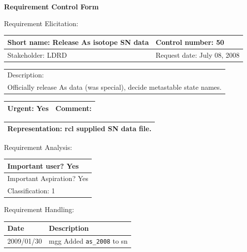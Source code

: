 \begin{center}\Large\bf
Requirement Control Form
\end{center}
\vspace{24pt}

Requirement Elicitation:

\begin{tabular}{|p{211pt}|p{211pt}|} \hline
Short name: Release As isotope SN data & Control number: 50\\ \hline
Stakeholder: LDRD & Request date: July 08, 2008\\
\end{tabular}
\begin{tabular}{|p{433pt}|} \hline
Description: \\ 
Officially release As data (was special), decide metastable state
names.\\
\hline
\end{tabular} 
\begin{tabular}{|p{211pt}|p{211pt}|} \hline
Urgent: Yes & Comment: \\ \hline
\end{tabular}

\vspace{12pt}

\begin{tabular}{|p{433pt}|} \hline
Representation: rcl supplied SN data file. \\ \hline
\end{tabular}
\vspace{24pt}

Requirement Analysis:

\begin{tabular}{|p{433pt}|} \hline
Important user? Yes \\ \hline
Important Aspiration? Yes \\ \hline
Classification: 1 \\ \hline
\end{tabular}
\vspace{24pt}

Requirement Handling:

\begin{tabular}{|p{72pt}|p{351pt}|} \hline
Date & Description \\ \hline
2009/01/30 & mgg Added \texttt{as\_2008} to sn\\ \hline
\end{tabular}
